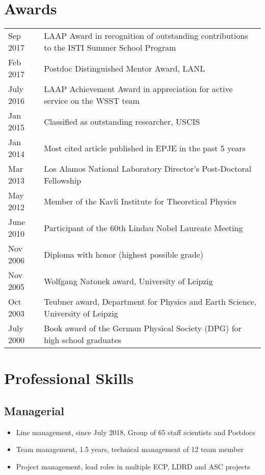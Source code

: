 \documentclass{article}
\begin{document}
\section*{Awards}
\begin{tabular}{ll}
Sep 2017 & LAAP Award in recognition of outstanding contributions to the ISTI Summer School Program \\
Feb 2017 & Postdoc Distinguished Mentor Award, LANL \\
July 2016 & LAAP Achievement Award in appreciation for active service on the WSST team \\
Jan 2015 & Classified as outstanding researcher, USCIS \\
Jan 2014 & Most cited article published in EPJE in the past 5 years \\
Mar 2013 & Los Alamos National Laboratory Director's Post-Doctoral Fellowship \\
May 2012 & Member of the Kavli Institute for Theoretical Physics\\
June 2010 & Participant of the 60th Lindau Nobel Laureate Meeting\\
Nov 2006 & Diploma with honor (highest possible grade) \\
Nov 2005  & Wolfgang Natonek award, University of Leipzig\\
Oct 2003  & Teubner award, Department for Physics and Earth Science, University of Leipzig\\
July 2000 & Book award of the German Physical Society (DPG) for high school graduates\\
\end{tabular}

\section*{Professional Skills}

\subsection*{Managerial}

\begin{itemize}
\setlength{\itemsep}{0pt}
\setlength{\parskip}{0pt}
\setlength{\parsep}{0pt}
\item Line management, since July 2018, Group of 65 staff scientists and Postdocs
\item Team management, 1.5 years, technical management of 12 team member
\item Project management, lead roles in multiple ECP, LDRD and ASC projects 
\end{itemize}
\end{document}
